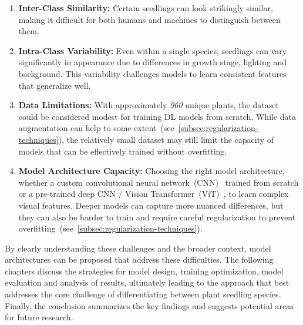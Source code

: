 \begin{enumerate}
    \item \textbf{Inter-Class Similarity:} Certain seedlings can look strikingly similar, making it difficult for both humans and machines to distinguish between them.
    \item \textbf{Intra-Class Variability:} Even within a single species, seedlings can vary significantly in appearance due to differences in growth stage, lighting and background. This variability challenges models to learn consistent features that generalize well.
    \item \textbf{Data Limitations:} With approximately \textit{960} unique plants, the dataset could be considered modest for training DL models from scratch. While data augmentation can help to some extent~(see~\ref{subsec:regularization-techniques}), the relatively small dataset may still limit the capacity of models that can be effectively trained without overfitting.
    \item \textbf{Model Architecture Capacity:} Choosing the right model architecture, whether a custom convolutional neural network~(CNN)~\cite{o2015introduction} trained from scratch or a pre-trained deep CNN / Vision Transformer~(ViT)~\cite{DBLP:journals/corr/abs-2010-11929}, to learn complex visual features. Deeper models can capture more nuanced differences, but they can also be harder to train and require careful regularization to prevent overfitting~(see~\ref{subsec:regularization-techniques}).
\end{enumerate}

By clearly understanding these challenges and the broader context, model architectures can be proposed that address these difficulties. The following chapters discuss the strategies for model design, training optimization, model evaluation and analysis of results, ultimately leading to the approach that best addresses the core challenge of differentiating between plant seedling species. Finally, the conclusion summarizes the key findings and suggests potential areas for future research.